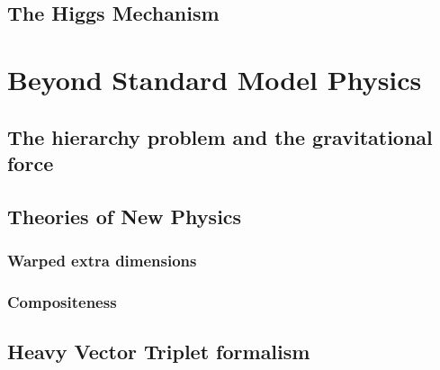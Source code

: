 \subsection{The Higgs Mechanism}
\section{Beyond Standard Model Physics}
\subsection{The hierarchy problem and the gravitational force}
\subsection{Theories of New Physics}
\subsubsection{Warped extra dimensions}
\label{sec:theory:wed}
\subsubsection{Compositeness}
\subsection{Heavy Vector Triplet formalism}
\label{sec:theory:hvt}
	
